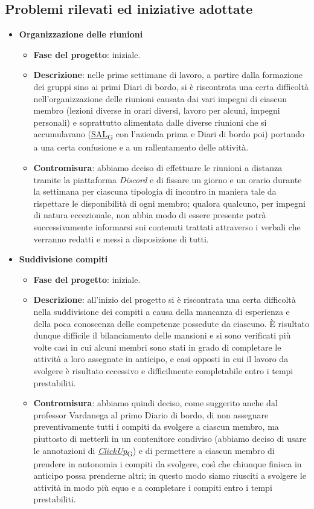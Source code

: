 \subsection{Problemi rilevati ed iniziative adottate}
\begin{itemize}
    \item \textbf{Organizzazione delle riunioni}
    \begin{itemize}
        \item \textbf{Fase del progetto}: iniziale.
        \item \textbf{Descrizione}: nelle prime settimane di lavoro, a partire dalla formazione dei gruppi sino ai primi Diari di bordo, si è riscontrata una certa difficoltà nell'organizzazione delle riunioni causata dai vari impegni di ciascun membro (lezioni diverse in orari diversi, lavoro per alcuni, impegni personali) e soprattutto alimentata dalle diverse riunioni che si accumulavano (\href{https://7last.github.io/docs/pb/documentazione-interna/glossario\#stato-avanzamento-lavori}{SAL\textsubscript{G}} con l'azienda prima e Diari di bordo poi) portando a una certa confusione e a un rallentamento delle attività.
        \item \textbf{Contromisura}: abbiamo deciso di effettuare le riunioni a distanza tramite la piattaforma \textit{Discord} e di fissare un giorno e un orario durante la settimana per ciascuna tipologia di incontro in maniera tale da rispettare le disponibilità di ogni membro; qualora qualcuno, per impegni di natura eccezionale, non abbia modo di essere presente potrà successivamente informarsi sui contenuti trattati attraverso i verbali che verranno redatti e messi a disposizione di tutti.
    \end{itemize}
    \item \textbf{Suddivisione compiti}
    \begin{itemize}
        \item \textbf{Fase del progetto}: iniziale.
        \item \textbf{Descrizione}: all'inizio del progetto si è riscontrata una certa difficoltà nella suddivisione dei compiti a causa della mancanza di esperienza e della poca conoscenza delle competenze possedute da ciascuno. È risultato dunque difficile il bilanciamento delle mansioni e si sono verificati più volte casi in cui alcuni membri sono stati in grado di completare le attività a loro assegnate in anticipo, e casi opposti in cui il lavoro da svolgere è risultato eccessivo e difficilmente completabile entro i tempi prestabiliti.
        \item \textbf{Contromisura}: abbiamo quindi deciso, come suggerito anche dal professor Vardanega al primo Diario di bordo, di non assegnare preventivamente tutti i compiti da svolgere a ciascun membro, ma piuttosto di metterli in un contenitore condiviso (abbiamo deciso di usare le annotazioni di \href{https://7last.github.io/docs/pb/documentazione-interna/glossario\#clickup}{\textit{ClickUp}\textsubscript{G}}) e di permettere a ciascun membro di prendere in autonomia i compiti da svolgere, così che chiunque finisca in anticipo possa prenderne altri; in questo modo siamo riusciti a svolgere le attività in modo più equo e a completare i compiti entro i tempi prestabiliti.

\end{itemize}
\end{itemize}
